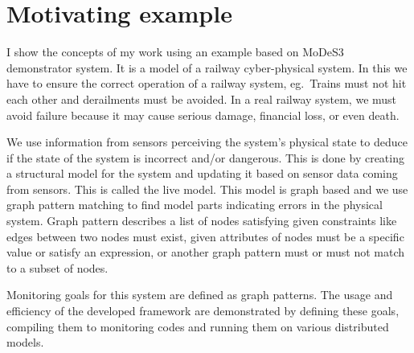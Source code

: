 \chapter{Motivating example}


I show the concepts of my work using an example based on MoDeS3~\cite{modes3} demonstrator system. It is a model of a railway cyber-physical system. In this we have to ensure the correct operation of a railway system, eg.\ Trains must not hit each other and derailments must be avoided. In a real railway system, we must avoid failure because it may cause serious damage, financial loss, or even death.

We use information from sensors perceiving the system's physical state to deduce if the state of the system is incorrect and/or dangerous. This is done by creating a structural model for the system and updating it based on sensor data coming from sensors. This is called the live model. This model is graph based and we use graph pattern matching to find model parts indicating errors in the physical system. Graph pattern describes a list of nodes satisfying given constraints like edges between two nodes must exist, given attributes of nodes must be a specific value or satisfy an expression, or another graph pattern must or must not match to a subset of nodes.

Monitoring goals for this system are defined as graph patterns. The usage and efficiency of the developed framework are demonstrated by defining these goals, compiling them to monitoring codes and running them on various distributed models.

 



